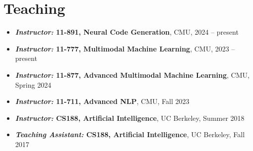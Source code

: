 \section{Teaching}
\begin{itemize}[leftmargin=-0.4mm,partopsep=0pt,label=]
  \item \textbf{\emph{Instructor:} 11-891, Neural Code Generation}, CMU, 2024 -- present
  \item \textbf{\emph{Instructor:} 11-777, Multimodal Machine Learning}, CMU, 2023 -- present
  \item \textbf{\emph{Instructor:} 11-877, Advanced Multimodal Machine Learning}, CMU, Spring 2024
  \item \textbf{\emph{Instructor:} 11-711, Advanced NLP}, CMU, Fall 2023

  \item \textbf{\emph{Instructor:} CS188, Artificial Intelligence}, UC Berkeley, Summer 2018
  \begin{comment}
    \begin{itemize}
      \item Co-taught (with Anwar Baroudi) a 160-student upper-division undergraduate introduction to AI. 
      \item Topics: search, games, Markov decision processes, reinforcement learning, graphical models, and machine learning.
      \item Prepared and delivered lectures; co-managed an 8-person course staff; designed exams; \\ co-supervised redesign of a course project; managed course logistics; held office hours and graded.
      \item Received UC Berkeley's Outstanding Graduate Instructor Award.
      \item \emph{Teaching effectiveness rating: 6.2 / 7}. The department average is 5.9 / 7. Rated in the top 25\% of instructors for this course in the last 10 years by teaching effectiveness.
    \end{itemize}
  \end{comment}

\item \textbf{\emph{Teaching Assistant:} CS188, Artificial Intelligence}, UC Berkeley, Fall 2017 
  \begin{comment}
    \begin{itemize}
      \item Teaching assistant for a 600-student upper-division undergraduate course.
      \item Taught a weekly section of students; helped design a machine learning project which has been completed by over 4,000 students at Berkeley in semesters since; helped write course notes, exams, and section problems; held office hours and graded.
      \item \emph{Teaching effectiveness rating: 4.6 / 5}. The department average is 4.3 / 5.
    \end{itemize}
  \end{comment}


\end{itemize}
